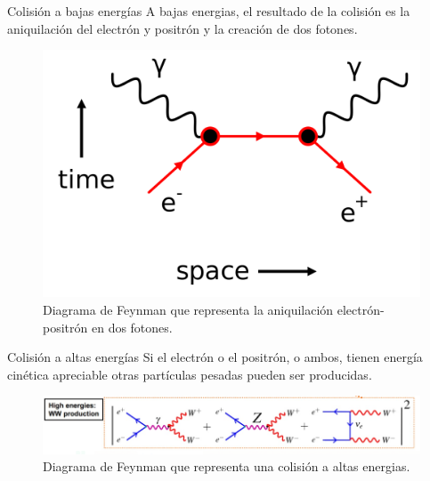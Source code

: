 \documentclass{beamer}
\begin{document}
\begin{frame}{Colisi\'on a bajas energ\'ias}
        A bajas energias, el resultado de la colisi\'on es la aniquilaci\'on del electr\'on y positr\'on y la creaci\'on de dos fotones.
        
        \begin{figure}
            \centering
            \includegraphics[scale = 0.08]{Bajas-energias.png}
            \caption{Diagrama de Feynman que representa la aniquilaci\'on electr\'on-positr\'on en dos fotones.}
            \label{fig:A-par-feynman}
        \end{figure}
\end{frame}


\begin{frame}{Colisi\'on a altas energ\'ias}
    Si el electr\'on o el positr\'on, o ambos, tienen energ\'ia cin\'etica apreciable otras part\'iculas pesadas pueden ser producidas. \\
    \vfill
    \begin{figure}
        \centering
        \includegraphics[scale = 0.5]{ColisionAEnergy.PNG}
        \caption{Diagrama de Feynman que representa una colisi\'on a altas energias.}
        \label{fig:Feynman-altasE}
    \end{figure}

\end{frame}
\end{document}
